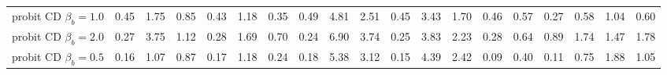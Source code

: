 \begin{table}
{\begin{tabular}{rllllllllllllllllll}
probit CD $\beta_b=1.0$     &  0.45 &  1.75 &  0.85 &  0.43 &  1.18 &  0.35 &  0.49 &  4.81 &  2.51 &    0.45 &  3.43 &  1.70 &  0.46 &  0.57 &  0.27 &  0.58 &  1.04 &  0.60 \\
probit CD $\beta_b=2.0$     &  0.27 &  3.75 &  1.12 &  0.28 &  1.69 &  0.70 &  0.24 &  6.90 &  3.74 &    0.25 &  3.83 &  2.23 &  0.28 &  0.64 &  0.89 &  1.74 &  1.47 &  1.78 \\
probit CD $\beta_b=0.5$     &  0.16 &  1.07 &  0.87 &  0.17 &  1.18 &  0.24 &  0.18 &  5.38 &  3.12 &    0.15 &  4.39 &  2.42 &  0.09 &  0.40 &  0.11 &  0.75 &  1.88 &  1.05 \\
\bottomrule
\end{tabular}
}
\end{table}
